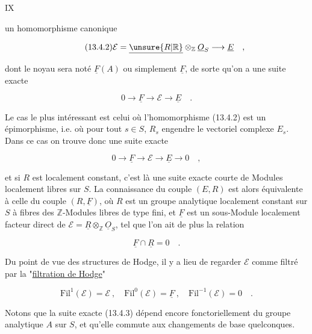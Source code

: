 
\hfill IX

un homomorphisme canonique

\[
\tag*{(13.4.2)}
\mathcal{E}=\underline{\unsure{R|\mathbb{R}}}\otimes_{\mathbb{Z}}\underline{O}_S\longrightarrow\underline{E}\quad ,
\]

dont le noyau sera noté $\underline{F}(A)$ ou simplement $\underline{F}$, de sorte qu'on a une suite exacte

\[
\tag*{(13.4.3)}
0\longrightarrow\underline{F}\longrightarrow\mathcal{E}\longrightarrow\underline{E}\quad .
\]

Le cas le plus intéressant est celui où l'homomorphisme (13.4.2) est un épimorphisme, i.e. où pour tout $s\in S$, $R_s$ engendre le vectoriel complexe $E_s$. Dans ce cas on trouve donc une suite exacte

\[
\tag*{(13.4.4)}
0\longrightarrow\underline{F}\longrightarrow\mathcal{E}\longrightarrow\underline{E}\longrightarrow0\quad ,
\]

et si $R$ est localement constant, c'est là une suite exacte courte de Modules localement libres sur $S$. La connaissance du couple $(E,R)$ est alors équivalente à celle du couple $(R,\underline{F})$, où $R$ est un groupe analytique localement constant sur $S$ à fibres des $\mathbb{Z}$-Modules libres de type fini, et $\underline{F}$ est un sous-Module localement facteur direct de $\mathcal{E}=\underline{R}\otimes_{\mathbb{Z}}\underline{O}_S$, tel que l'on ait de plus la relation

\[
\tag*{(13.4.5)}
\underline{F}\cap\underline{R}=0\quad .
\]

Du point de vue des structures de Hodge, il y a lieu de regarder $\mathcal{E}$ comme filtré par la "\uline{filtration de Hodge}"

\[
\tag*{(13.4.6)}
\mathrm{Fil}^{1}(\mathcal{E})=\mathcal{E}\ ,\quad \mathrm{Fil}^{0}(\mathcal{E})=\underline{F}\ ,\quad \mathrm{Fil}^{-1}(\mathcal{E})=0\quad .
\]

Notons que la suite exacte (13.4.3) dépend encore fonctoriellement du groupe analytique $A$ sur $S$, et qu'elle commute aux changements de base quelconques.



